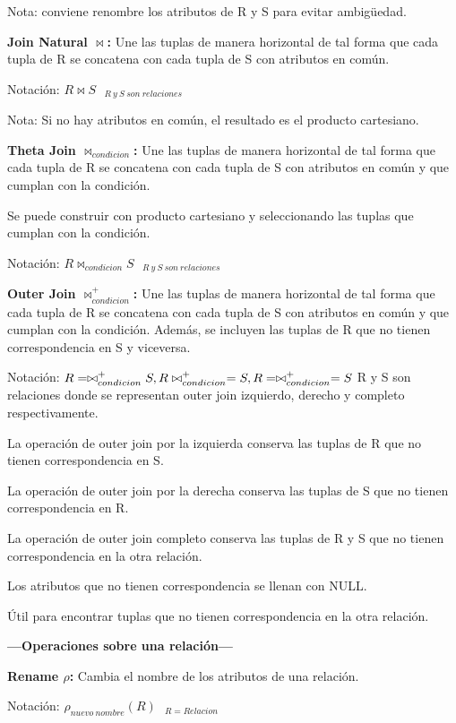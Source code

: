 \documentclass{article}
\begin{document}
Nota: conviene renombre los atributos de R y S para evitar ambigüedad.

\textbf{Join Natural $\bowtie$:} Une las tuplas de manera horizontal de tal forma que cada tupla de R se concatena con cada tupla de S con atributos en común.

Notación: $R\bowtie S\ \ \ _{R\ y\ S\ son\ relaciones}$

Nota: Si no hay atributos en común, el resultado es el producto cartesiano.

\textbf{Theta Join $\bowtie _{condicion}$:} Une las tuplas de manera horizontal de tal forma que cada tupla de R se concatena con cada tupla de S con atributos en común y que cumplan con la condición.

Se puede construir con producto cartesiano y seleccionando las tuplas que cumplan con la condición.

Notación: $R\bowtie _{condicion} S\ \ \ _{R\ y\ S\ son\ relaciones}$

\textbf{Outer Join $\bowtie _{condicion} ^{+}$:} Une las tuplas de manera horizontal de tal forma que cada tupla de R se concatena con cada tupla de S con atributos en común y que cumplan con la condición. Además, se incluyen las tuplas de R que no tienen correspondencia en S y viceversa.

Notación: $R=\bowtie _{condicion} ^{+} S, R\bowtie _{condicion} ^{+} =S, R=\bowtie _{condicion} ^{+} =S\\$
R y S son relaciones donde se representan outer join izquierdo, derecho y completo respectivamente.

La operación de outer join por la izquierda conserva las tuplas de R que no tienen correspondencia en S.

La operación de outer join por la derecha conserva las tuplas de S que no tienen correspondencia en R.

La operación  de outer join completo conserva las tuplas de R y S que no tienen correspondencia en la otra relación.

Los atributos que no tienen correspondencia se llenan con NULL.

Útil para encontrar tuplas que no tienen correspondencia en la otra relación.

\pagebreak
\centerline{\textbf{---Operaciones sobre una relación---}}

\textbf{Rename $\rho$:} Cambia el nombre de los atributos de una relación.

Notación: $\rho _{nuevo\ nombre}(R)\ \ \ _{R=Relacion}$
\end{document}
